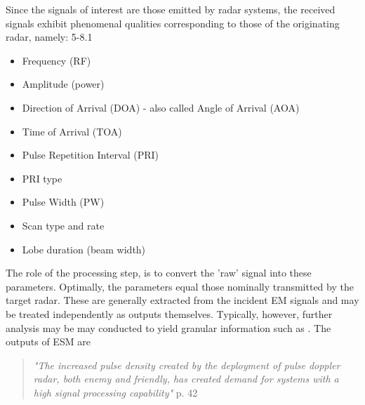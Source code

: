 Since the signals of interest are those emitted by radar systems, the received signals exhibit phenomenal qualities corresponding to those of the originating radar, namely: \cite{avionics_department_electronic_2013} 5-8.1
\begin{itemize}
    \item Frequency (RF)%
    \item Amplitude (power)
    \item Direction of Arrival (DOA) - also called Angle of Arrival (AOA)
    \item Time of Arrival (TOA)
    \item Pulse Repetition Interval (PRI)%
    \item PRI type
    \item Pulse Width (PW)
    \item Scan type and rate
    \item Lobe duration (beam width)%
\end{itemize}

The role of the processing step, is to convert the 'raw' signal into these parameters. Optimally, the parameters equal those nominally transmitted by the target radar.
These are generally extracted from the incident EM signals and may be treated independently as outputs themselves. Typically, however, further analysis may be may conducted to yield granular information such as .
The outputs of ESM are 


\begin{quote}
    \textit{"The increased pulse density created by the deployment of pulse doppler radar, both enemy and friendly, has created demand for systems with a high signal processing capability"} \cite{pettersson_illustrated_1992} p. 42
\end{quote}


